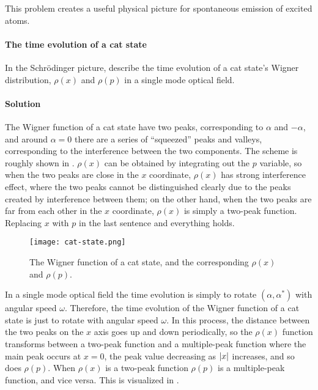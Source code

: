 \documentclass[hyperref, a4paper]{article}
\begin{document}
This problem creates a useful physical picture for spontaneous emission of excited atoms.

\paragraph{}

\paragraph{The time evolution of a cat state} In the Schrödinger picture, describe the time evolution of a cat state's Wigner distribution, $\rho(x)$ and $\rho(p)$ in a single mode optical field.

\paragraph{Solution} The Wigner function of a cat state have two peaks, corresponding to $\alpha$ and $-\alpha$, and around $\alpha = 0$ there are a series of ``squeezed'' peaks and valleys, corresponding to the interference between the two components.
The scheme is roughly shown in .
$\rho(x)$ can be obtained by integrating out the $p$ variable, so when the two peaks are close in the $x$ coordinate, $\rho(x)$ has strong interference effect, where the two peaks cannot be distinguished clearly due to the peaks created by interference between them; on the other hand, when the two peaks are far from each other in the $x$ coordinate, $\rho(x)$ is simply a two-peak function.
Replacing $x$ with $p$ in the last sentence and everything holds.

\begin{figure}
    \centering
    \texttt{[image: cat-state.png]}
    \caption{The Wigner function of a cat state, and the corresponding $\rho(x)$ and $\rho(p)$.}
    \label{fig:cat-state}
\end{figure}

In a single mode optical field the time evolution is simply to rotate $(\alpha, \alpha^*)$ with angular speed $\omega$.
Therefore, the time evolution of the Wigner function of a cat state is just to rotate  with angular speed $\omega$.
In this process, the distance between the two peaks on the $x$ axis goes up and down periodically, so the $\rho(x)$ function transforms between a two-peak function and a multiple-peak function where the main peak occurs at $x=0$, the peak value decreasing as $\abs{x}$ increases, and so does $\rho(p)$.
When $\rho(x)$ is a two-peak function $\rho(p)$ is a multiple-peak function, and vice versa.
This is visualized in \cite{cat-state}. 
\end{document}
